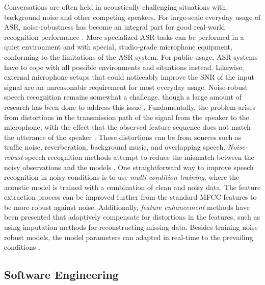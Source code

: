 \documentclass[english, 12pt, a4paper, pdftex, elec, utf8]{aaltothesis}
\begin{document}
Conversations are often held in acoustically challenging situations with background noise and other competing speakers. For large-scale everyday usage of ASR, noise-robustness has become an integral part for good real-world recognition performance \cite{li2014overview}. More specialized ASR tasks can be performed in a quiet environment and with special, studio-grade microphone equipment, conforming to the limitations of the ASR system. For public usage, ASR systems have to cope with all possible environments and situations instead. Likewise, external microphone setups that could noticeably improve the SNR of the input signal are an unreasonable requirement for most everyday usage. Noise-robust speech recognition remains somewhat a challenge, though a large amount of research has been done to address this issue \cite{kallasjoki2016, keronen2010comparison, keronen2014approaching, li2014overview, qian2016very}. Fundamentally, the problem arises from distortions in the transmission path of the signal from the speaker to the microphone, with the effect that the observed feature sequence does not match the utterance of the speaker \cite{kallasjoki2016, li2014overview}. These distortions can be from sources such as traffic noise, reverberation, background music, and overlapping speech. \textit{Noise-robust} speech recognition methods attempt to reduce the mismatch between the noisy observations and the models \cite{li2014overview, kallasjoki2016, keronen2010comparison}. One straightforward way to improve speech recognition in noisy conditions is to use \textit{multi-condition training}, where the acoustic model is trained with a combination of clean and noisy data. The feature extraction process can be improved further from the standard MFCC features to be more robust against noise. Additionally, \textit{feature enhancement} methods have been presented that adaptively compensate for distortions in the features, such as using imputation methods for reconstructing missing data. Besides training noise robust models, the model parameters can adapted in real-time to the prevailing conditions \cite{kallasjoki2016}.

\subsection{Software Engineering} \label{subsec:soft}
\end{document}

